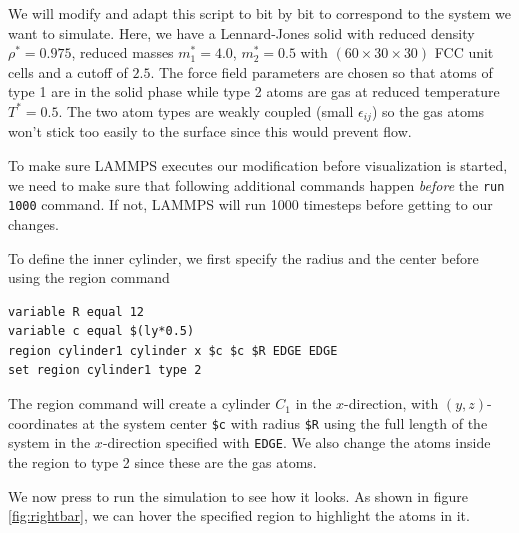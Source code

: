 \documentclass[12pt,a4paper,final]{iopart}
\newcommand{\code}[1]{\colorbox{light-gray}{\color{RawSienna}\texttt{#1}}}
\begin{document}


We will modify and adapt this script to bit by bit to correspond to the system we want to simulate.
Here, we have a Lennard-Jones solid with reduced density
$\rho^* = 0.975$, reduced masses $m_1^* = 4.0$, $m_2^* = 0.5$ with $(60\times30\times30)$
FCC unit cells and a cutoff of $2.5$. 
The force field parameters are chosen so that atoms of type 1
are in the solid phase while type 2 atoms are gas at reduced temperature $T^*=0.5$.
The two atom types are weakly coupled (small $\epsilon_{ij}$) so the gas atoms won't
stick too easily to the surface since this would prevent flow.

To make sure LAMMPS executes our modification before visualization is started,
we need to make sure that following additional commands happen \textit{before} the \code{run 1000} command.
If not, LAMMPS will run 1000 timesteps before getting to our changes.

To define the inner cylinder, we first specify the radius and the center before using the region command
\begin{lstlisting}
variable R equal 12
variable c equal $(ly*0.5)
region cylinder1 cylinder x $c $c $R EDGE EDGE
set region cylinder1 type 2
\end{lstlisting}
The region command will create a cylinder $C_1$ in the $x$-direction, with $(y,z)$-coordinates at the 
system center \code{\$c} with radius \code{\$R} using the full length of the system in the $x$-direction specified with \code{EDGE}.
We also change the atoms inside the region to type 2 since these are the gas atoms.

We now press  to run the simulation to see how it looks.
As shown in figure \ref{fig:rightbar}, we can hover the specified region to highlight the atoms in it.
\end{document}

